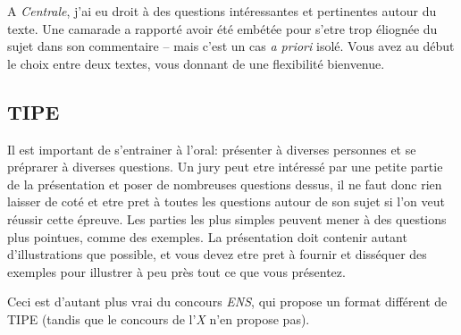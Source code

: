 \documentclass{article}
\begin{document}
A \textit{Centrale}, j'ai eu droit à des questions intéressantes et pertinentes autour du texte.
Une camarade a rapporté avoir été embétée pour s'etre trop éliognée du sujet dans son commentaire -- mais c'est un cas \textit{a priori} isolé.
Vous avez au début le choix entre deux textes, vous donnant de une flexibilité bienvenue.

\subsection{TIPE}
Il est important de s'entrainer à l'oral: présenter à diverses personnes et se préprarer à diverses questions.
Un jury peut etre intéressé par une petite partie de la présentation et poser de nombreuses questions dessus, il ne faut donc rien laisser de coté et etre pret à toutes les questions autour de son sujet si l'on veut réussir cette épreuve.
Les parties les plus simples peuvent mener à des questions plus pointues, comme des exemples.
La présentation doit contenir autant d'illustrations que possible, et vous devez etre pret à fournir et disséquer des exemples pour illustrer à peu près tout ce que vous présentez.

Ceci est d'autant plus vrai du concours \textit{ENS}, qui propose un format différent de TIPE (tandis que le concours de l'\textit{X} n'en propose pas).
\end{document}
